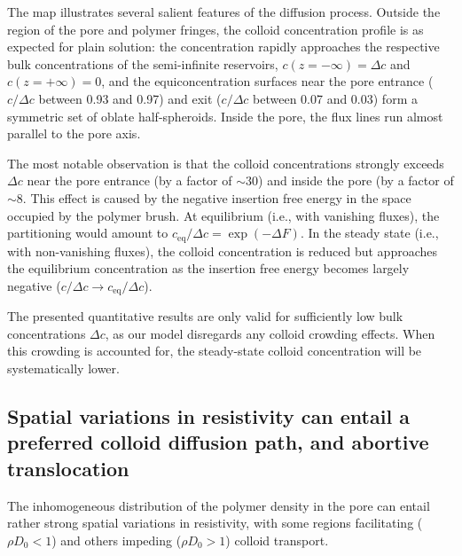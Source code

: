 \documentclass[12pt, a4paper]{article}
\begin{document}
The map illustrates several salient features of the diffusion process.
Outside the region of the pore and polymer fringes, the colloid concentration profile is as expected for plain solution: the concentration rapidly approaches the respective bulk concentrations of the semi-infinite reservoirs, $c(z = -\infty) = \Delta c$ and $c(z = +\infty) = 0$, and the equiconcentration surfaces near the pore entrance ($c/\Delta c$ between 0.93 and 0.97) and exit ($c/\Delta c$ between 0.07 and 0.03) form a symmetric set of oblate half-spheroids.
Inside the pore, the flux lines run almost parallel to the pore axis.

The most notable observation is that the colloid concentrations strongly exceeds $\Delta c$ near the pore entrance (by a factor of $\sim30$) and inside the pore (by a factor  of $\sim8$.
This effect is caused by the negative insertion free energy in the space occupied by the polymer brush.
At equilibrium (i.e., with vanishing fluxes), the partitioning would amount to $c_{\text{eq}}/\Delta c = \exp\left( -\Delta F \right)$.
In the steady state (i.e., with non-vanishing fluxes), the colloid concentration is reduced but approaches the equilibrium concentration as the insertion free energy becomes largely negative ($c/\Delta c \to c_{\text{eq}}/\Delta c$).

The presented quantitative results are only valid for sufficiently low bulk concentrations $\Delta c$, as our model disregards any colloid crowding effects.
When this crowding is accounted for, the steady-state colloid concentration will be systematically lower.


\subsection{Spatial variations in resistivity can entail a preferred colloid diffusion path, and abortive translocation}

The inhomogeneous distribution of the polymer density in the pore can entail rather strong spatial variations in resistivity, with some regions facilitating ($\rho D_0 < 1$) and others impeding ($\rho D_0 > 1$) colloid transport.

\end{document}
